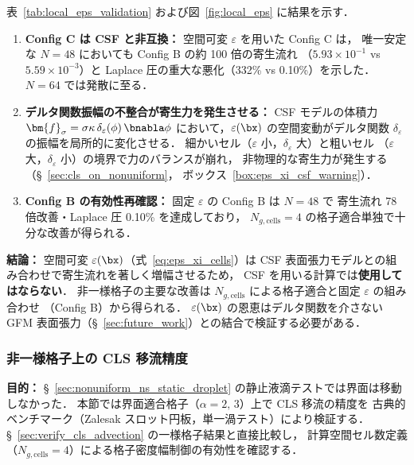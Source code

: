 表~\ref{tab:local_eps_validation} および図~\ref{fig:local_eps} に結果を示す．

\begin{enumerate}[noitemsep]
  \item \textbf{Config C は CSF と非互換：}
        空間可変 $\varepsilon$ を用いた Config C は，
        唯一安定な $N = 48$ においても Config B の約 100 倍の寄生流れ
        （$5.93 \times 10^{-1}$ vs $5.59 \times 10^{-3}$）と
        Laplace 圧の重大な悪化（332\% vs 0.10\%）を示した．
        $N = 64$ では発散に至る．
  \item \textbf{デルタ関数振幅の不整合が寄生力を発生させる：}
        CSF モデルの体積力 $\bm{f}_\sigma = \sigma\kappa\,\delta_\varepsilon(\phi)\,\bnabla\phi$
        において，$\varepsilon(\bx)$ の空間変動がデルタ関数
        $\delta_\varepsilon$ の振幅を局所的に変化させる．
        細かいセル（$\varepsilon$ 小，$\delta_\varepsilon$ 大）と粗いセル
        （$\varepsilon$ 大，$\delta_\varepsilon$ 小）の境界で力のバランスが崩れ，
        非物理的な寄生力が発生する（§~\ref{sec:cls_on_nonuniform}，
        ボックス~\ref{box:eps_xi_csf_warning}）．
  \item \textbf{Config B の有効性再確認：}
        固定 $\varepsilon$ の Config B は $N = 48$ で
        寄生流れ 78 倍改善・Laplace 圧 0.10\% を達成しており，
        $N_{g,\text{cells}} = 4$ の格子適合単独で十分な改善が得られる．
\end{enumerate}

\noindent\textbf{結論：}
空間可変 $\varepsilon(\bx)$（式~\eqref{eq:eps_xi_cells}）は
CSF 表面張力モデルとの組み合わせで寄生流れを著しく増幅させるため，
CSF を用いる計算では\textbf{使用してはならない}．
非一様格子の主要な改善は $N_{g,\text{cells}}$ による格子適合と固定 $\varepsilon$ の組み合わせ
（Config B）から得られる．
$\varepsilon(\bx)$ の恩恵はデルタ関数を介さない
GFM 表面張力（§~\ref{sec:future_work}）との結合で検証する必要がある．


\subsubsection{非一様格子上の CLS 移流精度}
\label{sec:nonuniform_advection}

\noindent\textbf{目的：}
§~\ref{sec:nonuniform_ns_static_droplet} の静止液滴テストでは界面は移動しなかった．
本節では界面適合格子（$\alpha = 2,\,3$）上で CLS 移流の精度を
古典的ベンチマーク（Zalesak スロット円板，単一渦テスト）により検証する．
§~\ref{sec:verify_cls_advection} の一様格子結果と直接比較し，
計算空間セル数定義（$N_{g,\text{cells}} = 4$）による格子密度幅制御の有効性を確認する．

